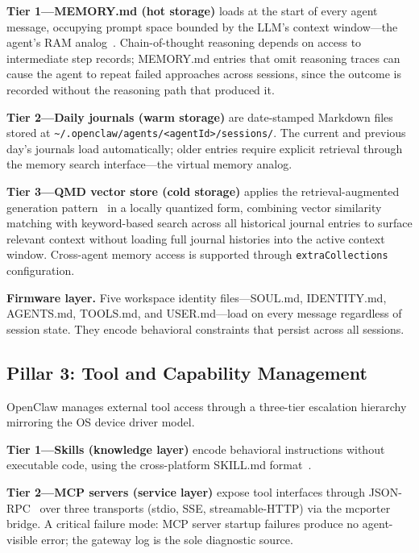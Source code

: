 \documentclass[journal]{IEEEtran}
\begin{document}
\textbf{Tier 1---MEMORY.md (hot storage)} loads at the start of every agent
message, occupying prompt space bounded by the LLM's context window---the
agent's RAM analog~\cite{openclaw2024docs}. Chain-of-thought reasoning
\cite{wei2022cot} depends on access to intermediate step records; MEMORY.md
entries that omit reasoning traces can cause the agent to repeat failed
approaches across sessions, since the outcome is recorded without the
reasoning path that produced it.

\textbf{Tier 2---Daily journals (warm storage)} are date-stamped Markdown files
stored at \texttt{\textasciitilde/.openclaw/agents/<agentId>/sessions/}. The
current and previous day's journals load automatically; older entries require
explicit retrieval through the memory search interface---the virtual memory
analog.

\textbf{Tier 3---QMD vector store (cold storage)} applies the
retrieval-augmented generation pattern~\cite{lewis2020rag} in a locally
quantized form, combining vector similarity matching with keyword-based
search across all historical journal entries to surface relevant context
without loading full journal histories into the active context window.
Cross-agent memory access is supported through \texttt{extraCollections}
configuration.

\textbf{Firmware layer.} Five workspace identity files---SOUL.md, IDENTITY.md,
AGENTS.md, TOOLS.md, and USER.md---load on every message regardless of session
state. They encode behavioral constraints that persist across all sessions.

\subsection{Pillar 3: Tool and Capability Management}

OpenClaw manages external tool access through a three-tier escalation hierarchy
mirroring the OS device driver model.

\textbf{Tier 1---Skills (knowledge layer)} encode behavioral instructions
without executable code, using the cross-platform SKILL.md
format~\cite{openclaw2024docs}.

\textbf{Tier 2---MCP servers (service layer)} expose tool interfaces through
JSON-RPC~\cite{anthropic2024mcp} over three transports (stdio, SSE,
streamable-HTTP) via the mcporter bridge. A critical failure mode: MCP server
startup failures produce no agent-visible error; the gateway log is the sole
diagnostic source.
\end{document}
